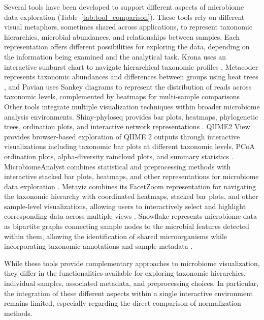 \documentclass[pdflatex,sn-vancouver-num]{sn-jnl}%
\theoremstyle{thmstyleone}%
\theoremstyle{thmstyletwo}%
\theoremstyle{thmstylethree}%
\begin{document}
Several tools have been developed to support different aspects of microbiome data exploration (Table~\ref{tab:tool_comparison}). These tools rely on different visual metaphors, sometimes shared across applications, to represent taxonomic hierarchies, microbial abundances, and relationships between samples. Each representation offers different possibilities for exploring the data, depending on the information being examined and the analytical task. Krona uses an interactive sunburst chart to navigate hierarchical taxonomic profiles \citep{ondov_interactive_2011}, Metacoder represents taxonomic abundances and differences between groups using heat trees \citep{foster_metacoder_2017}, and Pavian uses Sankey diagrams to represent the distribution of reads across taxonomic levels, complemented by heatmaps for multi-sample comparisons \citep{breitwieser_pavian_2020}. Other tools integrate multiple visualization techniques within broader microbiome analysis environments. Shiny-phyloseq provides bar plots, heatmaps, phylogenetic trees, ordination plots, and interactive network representations \citep{mcmurdie_shiny-phyloseq_2015}. QIIME2 View provides browser-based exploration of QIIME 2 outputs through interactive visualizations including taxonomic bar plots at different taxonomic levels, PCoA ordination plots, alpha-diversity raincloud plots, and summary statistics \citep{bolyen_reproducible_2019}. MicrobiomeAnalyst combines statistical and preprocessing methods with interactive stacked bar plots, heatmaps, and other representations for microbiome data exploration \citep{lu_microbiomeanalyst_2023}. Metaviz combines its FacetZoom representation for navigating the taxonomic hierarchy with coordinated heatmaps, stacked bar plots, and other sample-level visualizations, allowing users to interactively select and highlight corresponding data across multiple views \citep{wagner_metaviz_2018}. Snowflake represents microbiome data as bipartite graphs connecting sample nodes to the microbial features detected within them, allowing the identification of shared microorganisms while incorporating taxonomic annotations and sample metadata \citep{peeters_snowflake_2024}.

While these tools provide complementary approaches to microbiome visualization, they differ in the functionalities available for exploring taxonomic hierarchies, individual samples, associated metadata, and preprocessing choices. In particular, the integration of these different aspects within a single interactive environment remains limited, especially regarding the direct comparison of normalization methods.
\end{document}
